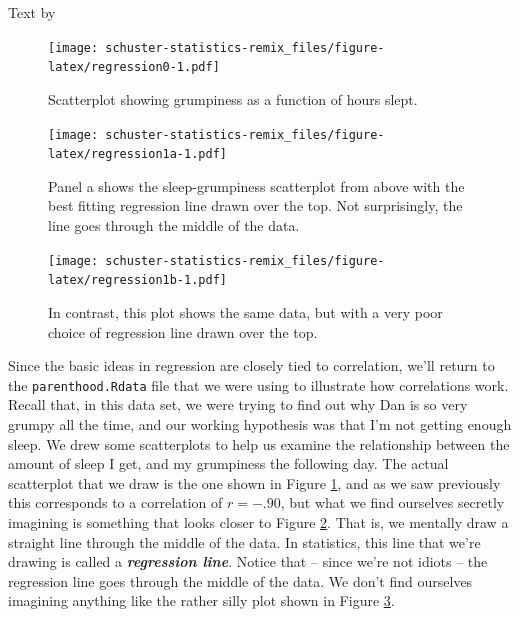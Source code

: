 \documentclass[
]{book}
\begin{document}
Text by \citet{Navarro2018}

\begin{figure}
\centering
\texttt{[image: schuster-statistics-remix\_files/figure-latex/regression0-1.pdf]}
\caption{\label{fig:regression0}Scatterplot showing grumpiness as a function of hours slept.}
\end{figure}

\begin{figure}
\centering
\texttt{[image: schuster-statistics-remix\_files/figure-latex/regression1a-1.pdf]}
\caption{\label{fig:regression1a}Panel a shows the sleep-grumpiness scatterplot from above with the best fitting regression line drawn over the top. Not surprisingly, the line goes through the middle of the data.}
\end{figure}

\begin{figure}
\centering
\texttt{[image: schuster-statistics-remix\_files/figure-latex/regression1b-1.pdf]}
\caption{\label{fig:regression1b}In contrast, this plot shows the same data, but with a very poor choice of regression line drawn over the top.}
\end{figure}

Since the basic ideas in regression are closely tied to correlation, we'll return to the \texttt{parenthood.Rdata} file that we were using to illustrate how correlations work. Recall that, in this data set, we were trying to find out why Dan is so very grumpy all the time, and our working hypothesis was that I'm not getting enough sleep. We drew some scatterplots to help us examine the relationship between the amount of sleep I get, and my grumpiness the following day. The actual scatterplot that we draw is the one shown in Figure \ref{fig:regression0}, and as we saw previously this corresponds to a correlation of \(r=-.90\), but what we find ourselves secretly imagining is something that looks closer to Figure \ref{fig:regression1a}. That is, we mentally draw a straight line through the middle of the data. In statistics, this line that we're drawing is called a \textbf{\emph{regression line}}. Notice that -- since we're not idiots -- the regression line goes through the middle of the data. We don't find ourselves imagining anything like the rather silly plot shown in Figure \ref{fig:regression1b}.
\end{document}

